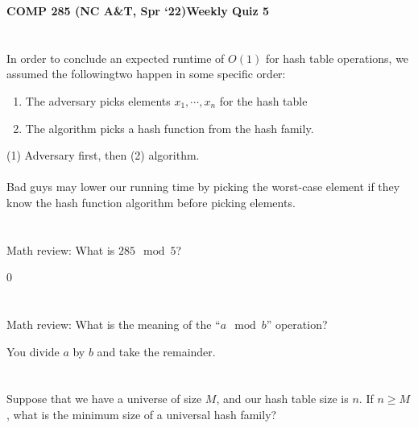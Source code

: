 \documentclass [12pt]{article}
\begin{document}
 

{\LARGE \textbf {COMP 285 (NC A\&T, Spr `22)}\hfill \textbf {Weekly Quiz 5} } 

\section{} In order to conclude an expected runtime of $O(1)$ for hash table operations, we assumed the followingtwo happen in some specific order: 
\begin{enumerate}
    \item The adversary picks elements $x_1, \cdots , x_n$ for the hash table
    \item The algorithm picks a hash function from the hash family.
\end{enumerate}

\begin{Solution}
(1) Adversary first, then (2) algorithm.
\paragraph{}

Bad guys may lower our running time by picking the worst-case element if they know the hash function algorithm before picking elements. 
\end{Solution}


\section{} Math review: What is $285 \mod 5$?

\begin{Solution}
0
\end{Solution}


\section{} Math review: What is the meaning of the ``$a \mod b$'' operation?

\begin{Solution}
You divide $a$ by $b$ and take the remainder.
\end{Solution}


\section{} Suppose that we have a universe of size $M$, and our hash table size is $n$. If $n \geq M$, what is the minimum size of a universal hash family?
\end{document}
